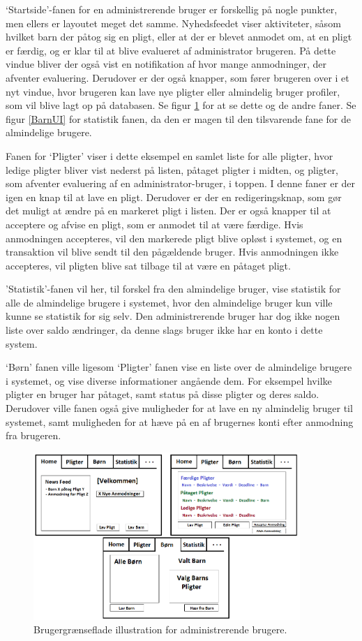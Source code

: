 ‘Startside’-fanen for en administrerende bruger er forskellig på nogle punkter, men ellers er layoutet meget det samme. Nyhedsfeedet viser aktiviteter, såsom hvilket barn der påtog sig en pligt, eller at der er blevet anmodet om, at en pligt er færdig, og er klar til at blive evalueret af administrator brugeren. På dette vindue bliver der også vist en notifikation af hvor mange anmodninger, der afventer evaluering. Derudover er der også knapper, som fører brugeren over i et nyt vindue, hvor brugeren kan lave nye pligter eller almindelig bruger profiler, som vil blive lagt op på databasen. Se figur \ref{ForalderUI} for at se dette og de andre faner. Se figur \ref{BarnUI} for statistik fanen, da den er magen til den tilsvarende fane for de almindelige brugere.

Fanen for ‘Pligter’ viser i dette eksempel en samlet liste for alle pligter, hvor ledige pligter bliver vist nederst på listen, påtaget pligter i midten, og pligter, som afventer evaluering af en administrator-bruger, i toppen. I denne faner er der igen en knap til at lave en pligt. Derudover er der en  redigeringsknap, som gør det muligt at ændre på en markeret pligt i listen. Der er også knapper til at acceptere og afvise en pligt, som er anmodet til at være færdige. Hvis anmodningen accepteres, vil den markerede pligt blive opløst i systemet, og en transaktion vil blive sendt til den pågældende bruger. Hvis anmodningen ikke accepteres, vil pligten blive sat tilbage til at være en påtaget pligt. 

'Statistik'-fanen vil her, til forskel fra den almindelige bruger, vise statistik for alle de almindelige brugere i systemet, hvor den almindelige bruger kun ville kunne se statistik for sig selv. Den administrerende bruger har dog ikke nogen liste over saldo ændringer, da denne slags bruger ikke har en konto i dette system. 

‘Børn’ fanen ville ligesom ‘Pligter’ fanen vise en liste over de almindelige brugere i systemet, og vise diverse informationer angående dem. For eksempel hvilke pligter en bruger har påtaget, samt status på disse pligter og deres saldo. Derudover ville fanen også give muligheder for at lave en ny almindelig bruger til systemet, samt muligheden for at hæve på en af brugernes konti efter anmodning fra brugeren.

\begin{figure}[H]
\centering
\includegraphics[width=0.9\textwidth]{Billeder/ForalderUI.png}
\caption{Brugergrænseflade illustration for administrerende brugere.}
\label{ForalderUI}
\end{figure}
